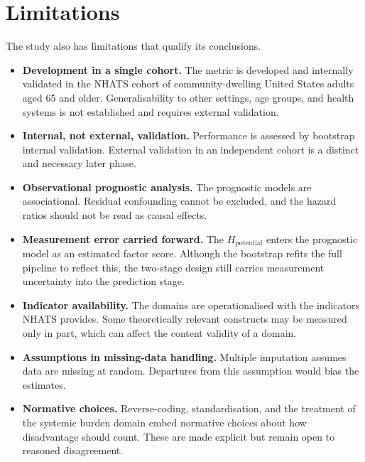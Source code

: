\section{Limitations}
\noindent The study also has limitations that qualify its conclusions.
\begin{itemize}
  \item \textbf{Development in a single cohort.} The metric is developed and internally validated in the NHATS cohort of community-dwelling United States adults aged 65 and older. Generalisability to other settings, age groups, and health systems is not established and requires external validation.
  \item \textbf{Internal, not external, validation.} Performance is assessed by bootstrap internal validation. External validation in an independent cohort is a distinct and necessary later phase.
  \item \textbf{Observational prognostic analysis.} The prognostic models are associational. Residual confounding cannot be excluded, and the hazard ratios should not be read as causal effects.
  \item \textbf{Measurement error carried forward.} The $H_{\text{potential}}$ enters the prognostic model as an estimated factor score. Although the bootstrap refits the full pipeline to reflect this, the two-stage design still carries measurement uncertainty into the prediction stage.
  \item \textbf{Indicator availability.} The domains are operationalised with the indicators NHATS provides. Some theoretically relevant constructs may be measured only in part, which can affect the content validity of a domain.
  \item \textbf{Assumptions in missing-data handling.} Multiple imputation assumes data are missing at random. Departures from this assumption would bias the estimates.
  \item \textbf{Normative choices.} Reverse-coding, standardisation, and the treatment of the systemic burden domain embed normative choices about how disadvantage should count. These are made explicit but remain open to reasoned disagreement.
\end{itemize}

